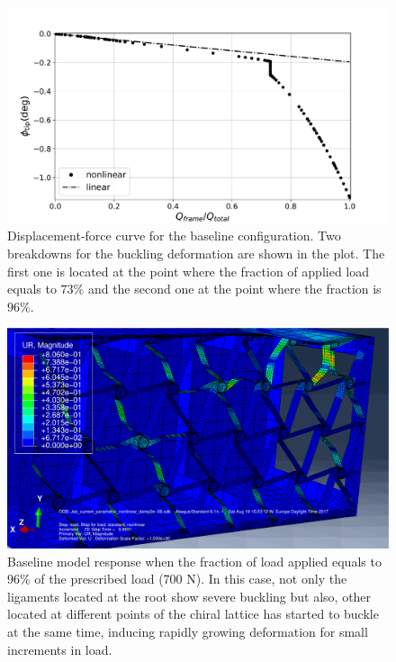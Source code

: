  \begin{figure}[!htpb] %
    \centering
    \includegraphics[width=0.8 \textwidth]{figures/../figures/result-sim/forceDisplacement-far}
    \caption[Displacement-force curve for the baseline configuration]{Displacement-force curve for the baseline configuration. Two breakdowns for the buckling deformation are shown in the plot. The first one is located at the point where the fraction of applied load equals to $73\%$ and the second one at the point where the fraction is $96\%$.}\label{fig:forceDisplacement-far}
  \end{figure}

  \begin{figure}[!htpb] %
    \centering
    \includegraphics[width=0.8 \textwidth]{figures/../figures/result-sim/3-UR}
    \caption[Baseline model response when the fraction of load applied equals to 96\% of the prescribed load (700 N)]{Baseline model response when the fraction of load applied equals to 96\% of the prescribed load (700 N). In this case, not only the ligaments located at the root show severe buckling but also, other located at different points of the chiral lattice has started to buckle at the same time, inducing rapidly growing deformation for small increments in load.}\label{fig:3-UR}
  \end{figure}

